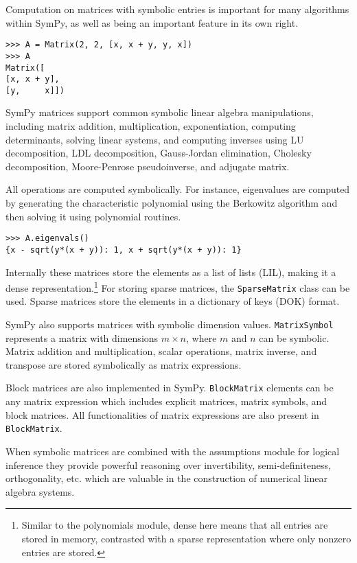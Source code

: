 Computation on matrices with symbolic entries is important for many algorithms
within SymPy, as well as being an important feature in its own right.
\begin{verbatim}
>>> A = Matrix(2, 2, [x, x + y, y, x])
>>> A
Matrix([
[x, x + y],
[y,     x]])
\end{verbatim}

SymPy matrices support common symbolic linear algebra manipulations, including
matrix addition, multiplication, exponentiation, computing determinants,
solving linear systems, and computing inverses using LU decomposition, LDL
decomposition, Gauss-Jordan elimination, Cholesky decomposition, Moore-Penrose
pseudoinverse, and adjugate matrix.

All operations are computed symbolically. For instance, eigenvalues are computed
by generating the characteristic polynomial using the Berkowitz algorithm and
then solving it using polynomial routines.

\begin{verbatim}
>>> A.eigenvals()
{x - sqrt(y*(x + y)): 1, x + sqrt(y*(x + y)): 1}
\end{verbatim}

Internally these matrices store the elements as a list of lists (LIL), making
it a dense representation.\footnote{Similar to the polynomials module, dense
  here means that all entries are stored in memory, contrasted with a sparse
  representation where only nonzero entries are stored.} For storing sparse
matrices, the \verb|SparseMatrix| class can be used. Sparse matrices store the
elements in a dictionary of keys (DOK) format.

SymPy also supports matrices with symbolic dimension values. \verb|MatrixSymbol|
represents a matrix with dimensions $m\times n$, where $m$ and $n$ can be
symbolic. Matrix addition and multiplication, scalar operations, matrix inverse,
and transpose are stored symbolically as matrix expressions.

Block matrices are also implemented in SymPy. \verb|BlockMatrix| elements can be any
matrix expression which includes explicit matrices, matrix symbols, and block
matrices. All functionalities of matrix expressions are also present in
\verb|BlockMatrix|.

When symbolic matrices are combined with the assumptions module for logical
inference they provide powerful reasoning over invertibility,
semi-definiteness, orthogonality, etc. which are valuable in the construction
of numerical linear algebra systems.
